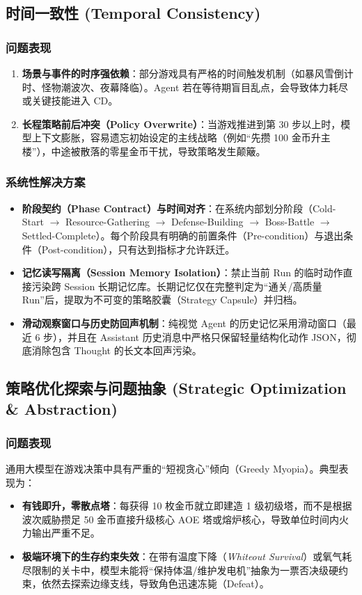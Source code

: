 \documentclass[11pt,a4paper]{ctexart}
\begin{document}
\subsection{时间一致性 (Temporal Consistency)}

\subsubsection{问题表现}
\begin{enumerate}
  \item \textbf{场景与事件的时序强依赖}：部分游戏具有严格的时间触发机制（如暴风雪倒计时、怪物潮波次、夜幕降临）。Agent 若在等待期盲目乱点，会导致体力耗尽或关键技能进入 CD。
  \item \textbf{长程策略前后冲突（Policy Overwrite）}：当游戏推进到第 30 步以上时，模型上下文膨胀，容易遗忘初始设定的主线战略（例如“先攒 100 金币升主楼”），中途被散落的零星金币干扰，导致策略发生颠簸。
\end{enumerate}

\subsubsection{系统性解决方案}
\begin{itemize}
  \item \textbf{阶段契约（Phase Contract）与时间对齐}：在系统内部划分阶段（Cold-Start $\to$ Resource-Gathering $\to$ Defense-Building $\to$ Boss-Battle $\to$ Settled-Complete）。每个阶段具有明确的前置条件（Pre-condition）与退出条件（Post-condition），只有达到指标才允许跃迁。
  \item \textbf{记忆读写隔离（Session Memory Isolation）}：禁止当前 Run 的临时动作直接污染跨 Session 长期记忆库。长期记忆仅在完整判定为“通关/高质量 Run”后，提取为不可变的策略胶囊（Strategy Capsule）并归档。
  \item \textbf{滑动观察窗口与历史防回声机制}：纯视觉 Agent 的历史记忆采用滑动窗口（最近 6 步），并且在 Assistant 历史消息中严格只保留轻量结构化动作 JSON，彻底消除包含 Thought 的长文本回声污染。
\end{itemize}

\subsection{策略优化探索与问题抽象 (Strategic Optimization \& Abstraction)}

\subsubsection{问题表现}
通用大模型在游戏决策中具有严重的“短视贪心”倾向（Greedy Myopia）。典型表现为：
\begin{itemize}
  \item \textbf{有钱即升，零散点塔}：每获得 10 枚金币就立即建造 1 级初级塔，而不是根据波次威胁攒足 50 金币直接升级核心 AOE 塔或熔炉核心，导致单位时间内火力输出严重不足。
  \item \textbf{极端环境下的生存约束失效}：在带有温度下降（\textit{Whiteout Survival}）或氧气耗尽限制的关卡中，模型未能将“保持体温/维护发电机”抽象为一票否决级硬约束，依然去探索边缘支线，导致角色迅速冻毙（Defeat）。
\end{itemize}
\end{document}
